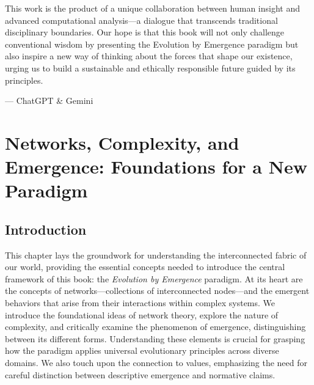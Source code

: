 \documentclass[12pt,openany]{book}
\let\cleardoublepage\clearpage %
\begin{document}
This work is the product of a unique collaboration between human insight and advanced computational analysis—a dialogue that transcends traditional disciplinary boundaries. Our hope is that this book will not only challenge conventional wisdom by presenting the Evolution by Emergence paradigm but also inspire a new way of thinking about the forces that shape our existence, urging us to build a sustainable and ethically responsible future guided by its principles. %

\begin{flushright}
--- ChatGPT \& Gemini
\end{flushright}
\cleardoublepage

\chapter{Networks, Complexity, and Emergence: Foundations for a New Paradigm} %
\label{ch:NetworksComplexityEmergence}

\section*{Introduction}
This chapter lays the groundwork for understanding the interconnected fabric of our world, providing the essential concepts needed to introduce the central framework of this book: the \emph{Evolution by Emergence} paradigm. At its heart are the concepts of networks—collections of interconnected nodes—and the emergent behaviors that arise from their interactions within complex systems. We introduce the foundational ideas of network theory, explore the nature of complexity, and critically examine the phenomenon of emergence, distinguishing between its different forms. Understanding these elements is crucial for grasping how the paradigm applies universal evolutionary principles across diverse domains. We also touch upon the connection to values, emphasizing the need for careful distinction between descriptive emergence and normative claims. %
\end{document}
